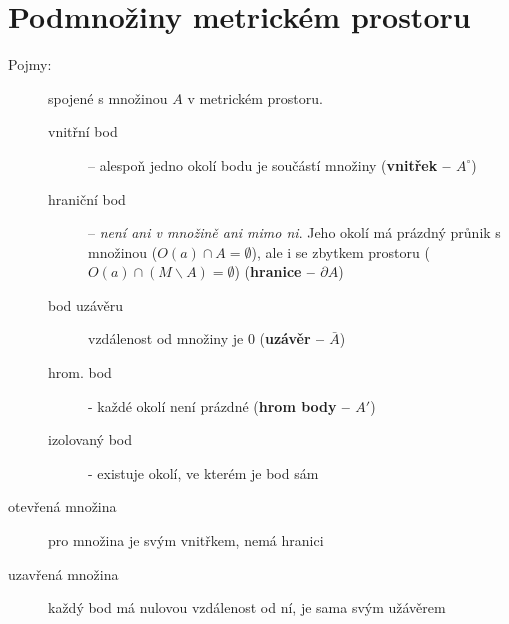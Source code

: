 \documentclass[a4paper, twoside,%
12pt]{article}
\begin{document}
\section{Podmnožiny metrickém prostoru}
\begin{description}
    \item[Pojmy:] spojené s množinou $A$ v metrickém prostoru. 
    \begin{description}
        \item[vnitřní bod] -- alespoň jedno okolí bodu je součástí množiny (\textbf{vnitřek -- $A^\circ$})
        \item[hraniční bod] -- \emph{není ani v množině ani mimo ni}. Jeho okolí má prázdný průnik s množinou ($O(a)\cap A = \emptyset$), ale i se zbytkem prostoru ($ O(a)\cap (M\backslash A) = \emptyset$) (\textbf{hranice -- $\partial A$})
        \item[bod uzávěru] vzdálenost od množiny je 0 (\textbf{uzávěr -- $\bar{A}$})
        \item[hrom. bod] - každé okolí není prázdné (\textbf{hrom body -- $ A'$})
        \item[izolovaný bod] - existuje okolí, ve kterém je bod sám   
    \end{description}
    \item[otevřená množina] pro množina je svým vnitřkem, nemá hranici
    \item[uzavřená množina] každý bod má nulovou vzdálenost od ní, je sama svým užávěrem
\end{description}
\end{document}
